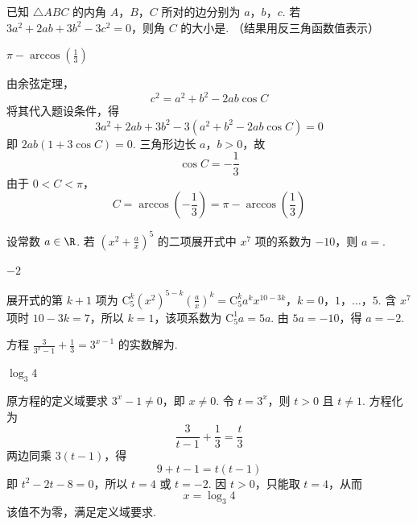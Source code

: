 \begin{problem}
已知 \(\triangle ABC\) 的内角 \(A\)，\(B\)，\(C\) 所对的边分别为 \(a\)，\(b\)，\(c\). 若 \(3a^2+2ab+3b^2-3c^2=0\)，则角 \(C\) 的大小是\fillinblank{}. （结果用反三角函数值表示）
\begin{answer}
\(\pi-\arccos\left(\frac{1}{3}\right)\)
\end{answer}

\begin{solution}
由余弦定理，
\[
c^2=a^2+b^2-2ab\cos C
\]
将其代入题设条件，得
\[
3a^2+2ab+3b^2-3(a^2+b^2-2ab\cos C)=0
\]
即 \(2ab(1+3\cos C)=0\). 三角形边长 \(a\)，\(b>0\)，故
\[
\cos C=-\frac{1}{3}
\]
由于 \(0<C<\pi\)，
\[
C=\arccos\left(-\frac{1}{3}\right)=\pi-\arccos\left(\frac{1}{3}\right)
\]
\end{solution}
\end{problem}

\begin{problem}
设常数 \(a \in \R\). 若 \(\left(x^2+\frac{a}{x}\right)^5\) 的二项展开式中 \(x^7\) 项的系数为 \(-10\)，则 \(a=\)\fillinblank{}.
\begin{answer}
\(-2\)
\end{answer}

\begin{solution}
展开式的第 \(k+1\) 项为
\(\mathrm C_5^k(x^2)^{5-k}\left(\frac{a}{x}\right)^k =\mathrm C_5^k a^k x^{10-3k}\)，\(k=0\)，\(1\)，\(\ldots\)，\(5\).
含 \(x^7\) 项时 \(10-3k=7\)，所以 \(k=1\)，该项系数为 \(\mathrm C_5^1 a=5a\). 由 \(5a=-10\)，得 \(a=-2\).
\end{solution}
\end{problem}

\begin{problem}
方程 \(\frac{3}{3^x-1}+\frac{1}{3}=3^{x-1}\) 的实数解为\fillinblank{}.
\begin{answer}
\(\log_{3}4\)
\end{answer}

\begin{solution}
原方程的定义域要求 \(3^x-1\ne0\)，即 \(x\ne0\). 令 \(t=3^x\)，则 \(t>0\) 且 \(t\ne1\). 方程化为
\[
\frac{3}{t-1}+\frac{1}{3}=\frac{t}{3}
\]
两边同乘 \(3(t-1)\)，得
\[
9+t-1=t(t-1)
\]
即 \(t^2-2t-8=0\)，所以 \(t=4\) 或 \(t=-2\). 因 \(t>0\)，只能取 \(t=4\)，从而
\[
x=\log_3 4
\]
该值不为零，满足定义域要求.
\end{solution}
\end{problem}

